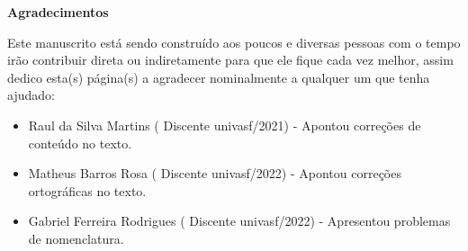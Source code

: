 \begingroup
\thispagestyle{empty}
\begin{center}
	{\normalfont\fontsize{20}{20}\sffamily\selectfont \textbf{Agradecimentos}}\par
\end{center}

\vspace{1cm}

Este manuscrito está sendo construído aos poucos e diversas pessoas com o tempo irão contribuir direta ou indiretamente para que ele fique cada vez melhor, assim dedico esta(s) página(s) a agradecer nominalmente a qualquer um que tenha ajudado:

\begin{itemize}
	\item {\color{red}Raul da Silva Martins} ({\color{blue} Discente univasf/2021}) - Apontou correções de conteúdo no texto.
	\item {\color{red}Matheus Barros Rosa} ({\color{blue} Discente univasf/2022}) - Apontou correções ortográficas no texto.
	\item {\color{red}Gabriel Ferreira Rodrigues} ({\color{blue} Discente univasf/2022}) - Apresentou problemas de nomenclatura.
\end{itemize}

\endgroup